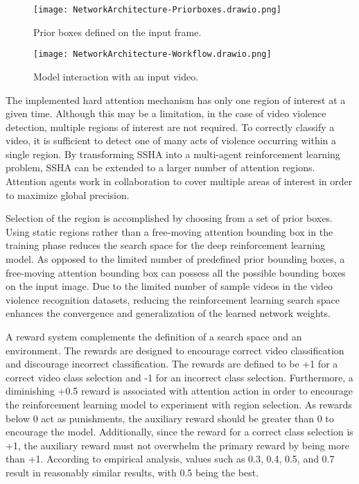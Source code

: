 \documentclass[review]{elsarticle}
\begin{document}
\begin{figure*}[!htbp]
    \centering
    \texttt{[image: NetworkArchitecture-Priorboxes.drawio.png]}
    \caption{Prior boxes defined on the input frame.}
    \label{fig:priorbox}
\end{figure*}

\begin{figure*}[!htbp]
    \centering
    \texttt{[image: NetworkArchitecture-Workflow.drawio.png]}
    \caption{Model interaction with an input video.}
    \label{fig:interaction}
\end{figure*}




The implemented hard attention mechanism has only one region of interest at a given time. Although this may be a limitation, in the case of video violence detection, multiple regions of interest are not required. To correctly classify a video, it is sufficient to detect one of many acts of violence occurring within a single region. By transforming SSHA into a multi-agent reinforcement learning problem, SSHA can be extended to a larger number of attention regions. Attention agents work in collaboration to cover multiple areas of interest in order to maximize global precision.

Selection of the region is accomplished by choosing from a set of prior boxes. Using static regions rather than a free-moving attention bounding box in the training phase reduces the search space for the deep reinforcement learning model. As opposed to the limited number of predefined prior bounding boxes, a free-moving attention bounding box can possess all the possible bounding boxes on the input image. Due to the limited number of sample videos in the video violence recognition datasets, reducing the reinforcement learning search space enhances the convergence and generalization of the learned network weights.

{A reward system complements the definition of a search space and an environment. The rewards are designed to encourage correct video classification and discourage incorrect classification. The rewards are defined to be +1 for a correct video class selection and -1 for an incorrect class selection. Furthermore, a diminishing +0.5 reward is associated with attention action in order to encourage the reinforcement learning model to experiment with region selection. As rewards below 0 act as punishments, the auxiliary reward should be greater than 0 to encourage the model. Additionally, since the reward for a correct class selection is +1, the auxiliary reward must not overwhelm the primary reward by being more than +1. According to empirical analysis, values such as 0.3, 0.4, 0.5, and 0.7 result in reasonably similar results, with 0.5 being the best.}
\end{document}
